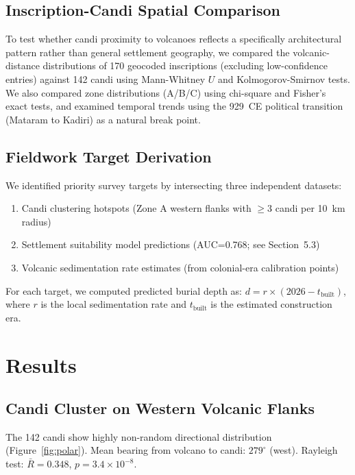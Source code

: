 \documentclass[12pt,a4paper]{article}
\begin{document}
\subsection{Inscription-Candi Spatial Comparison}
\label{sec:inscr_method}

To test whether candi proximity to volcanoes reflects a specifically architectural pattern rather than general settlement geography, we compared the volcanic-distance distributions of 170 geocoded inscriptions (excluding low-confidence entries) against 142 candi using Mann-Whitney $U$ and Kolmogorov-Smirnov tests. We also compared zone distributions (A/B/C) using chi-square and Fisher's exact tests, and examined temporal trends using the 929~CE political transition (Mataram to Kadiri) as a natural break point.

\subsection{Fieldwork Target Derivation}
\label{sec:targets}

We identified priority survey targets by intersecting three independent datasets:
\begin{enumerate}
    \item Candi clustering hotspots (Zone A western flanks with $\geq$3 candi per 10~km radius)
    \item Settlement suitability model predictions (AUC=0.768; see Section~5.3)
    \item Volcanic sedimentation rate estimates (from colonial-era calibration points)
\end{enumerate}

For each target, we computed predicted burial depth as: $d = r \times (2026 - t_{\text{built}})$, where $r$ is the local sedimentation rate and $t_{\text{built}}$ is the estimated construction era.

\section{Results}

\subsection{Candi Cluster on Western Volcanic Flanks}

The 142 candi show highly non-random directional distribution (Figure~\ref{fig:polar}). Mean bearing from volcano to candi: $279^{\circ}$ (west). Rayleigh test: $\bar{R}=0.348$, $p=3.4\times10^{-8}$.
\end{document}
